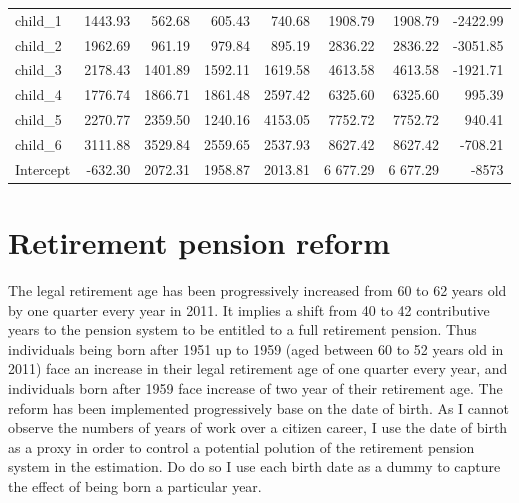 \begin{subappendices}
\begin{table}[H]
{\begin{tabular}{lrrrrrrr}
child\_1                                   &    1443.93 &     562.68 &     605.43 &     740.68 &                  1908.79 &    1908.79 &              -2422.99 \\
child\_2                                   &    1962.69 &     961.19 &     979.84 &     895.19 &                  2836.22 &    2836.22 &              -3051.85 \\
child\_3                                   &    2178.43 &    1401.89 &    1592.11 &    1619.58 &                  4613.58 &    4613.58 &              -1921.71 \\
child\_4                                   &    1776.74 &    1866.71 &    1861.48 &    2597.42 &                  6325.60 &    6325.60 &                995.39 \\
child\_5                                   &    2270.77 &    2359.50 &    1240.16 &    4153.05 &                  7752.72 &    7752.72 &                940.41 \\
child\_6                                   &    3111.88 &    3529.84 &    2559.65 &    2537.93 &                  8627.42 &    8627.42 &               -708.21 \\
Intercept	                                 & -632.30	  &    2072.31 &1958.87	    &    2013.81 &                  6 677.29&    6 677.29&                -8573 \\
\bottomrule
\end{tabular}
}
\end{table} 


\section{Retirement pension reform}
The legal retirement age has been progressively increased from 60 to 62 years old by one quarter every year in 2011. It implies a shift from 40 to 42 contributive years to the pension system to be entitled to a full retirement pension. Thus individuals being born after 1951 up to 1959 (aged between 60 to 52 years old in 2011) face an increase in their legal retirement age of one quarter every year, and individuals born after 1959 face increase of two year of their retirement age.
The reform has been implemented progressively base on the date of birth. As I cannot observe the numbers of years of work over a citizen career, I use the date of birth as a proxy in order to control a potential polution of the retirement pension system in the estimation. Do do so I use each birth date as a dummy to capture the effect of being born a particular year. 


\end{subappendices}
